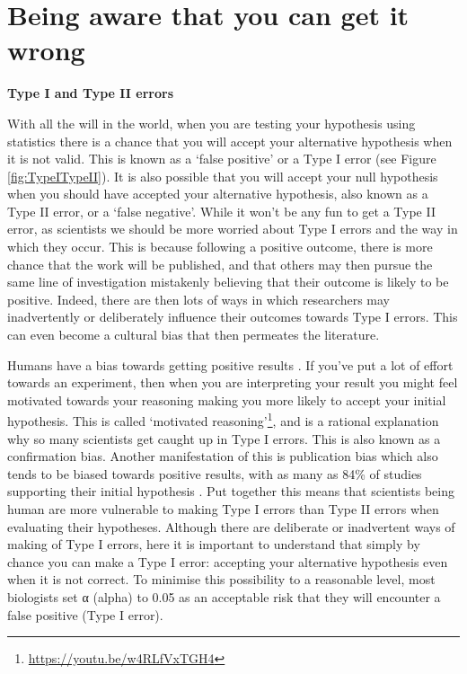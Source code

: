 \documentclass[
]{krantz}
\renewcommand{\href}[2]{#2\footnote{\url{#1}}}
\begin{document}
\hypertarget{TypeI}{%
\section{Being aware that you can get it wrong}\label{TypeI}}

\textbf{Type I and Type II errors }

With all the will in the world, when you are testing your hypothesis using statistics there is a chance that you will accept your alternative hypothesis when it is not valid. This is known as a `false positive' or a Type I error (see Figure \ref{fig:TypeITypeII}). It is also possible that you will accept your null hypothesis when you should have accepted your alternative hypothesis, also known as a Type II error, or a `false negative'. While it won't be any fun to get a Type II error, as scientists we should be more worried about Type I errors and the way in which they occur. This is because following a positive outcome, there is more chance that the work will be published, and that others may then pursue the same line of investigation mistakenly believing that their outcome is likely to be positive. Indeed, there are then lots of ways in which researchers may inadvertently or deliberately influence their outcomes towards Type I errors. This can even become a cultural bias that then permeates the literature.

Humans have a bias towards getting positive results \citep{trivers2011folly}. If you've put a lot of effort towards an experiment, then when you are interpreting your result you might feel motivated towards your reasoning making you more likely to accept your initial hypothesis. This is called \href{https://youtu.be/w4RLfVxTGH4}{`motivated reasoning'}, and is a rational explanation why so many scientists get caught up in Type I errors. This is also known as a confirmation bias. Another manifestation of this is publication bias which also tends to be biased towards positive results, with as many as 84\% of studies supporting their initial hypothesis \citep{fanelli2010positive}. Put together this means that scientists being human are more vulnerable to making Type I errors than Type II errors when evaluating their hypotheses. Although there are deliberate or inadvertent ways of making of Type I errors, here it is important to understand that simply by chance you can make a Type I error: accepting your alternative hypothesis even when it is not correct. To minimise this possibility to a reasonable level, most biologists set α (alpha) to 0.05 as an acceptable risk that they will encounter a false positive (Type I error).
\end{document}
